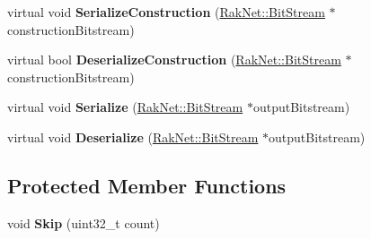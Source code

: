 \begin{DoxyCompactItemize}
\item 
\hypertarget{class_rak_net_1_1_rak_net_random_sync_a5b788f04394111d9384e5e667b8f8dec}{virtual void {\bfseries Serialize\-Construction} (\hyperlink{class_rak_net_1_1_bit_stream}{Rak\-Net\-::\-Bit\-Stream} $\ast$construction\-Bitstream)}\label{class_rak_net_1_1_rak_net_random_sync_a5b788f04394111d9384e5e667b8f8dec}

\item 
\hypertarget{class_rak_net_1_1_rak_net_random_sync_aa6e6738ea17f87cf605025b3141b3f04}{virtual bool {\bfseries Deserialize\-Construction} (\hyperlink{class_rak_net_1_1_bit_stream}{Rak\-Net\-::\-Bit\-Stream} $\ast$construction\-Bitstream)}\label{class_rak_net_1_1_rak_net_random_sync_aa6e6738ea17f87cf605025b3141b3f04}

\item 
\hypertarget{class_rak_net_1_1_rak_net_random_sync_a101abee8b1e2b53670e2c40484c7cb44}{virtual void {\bfseries Serialize} (\hyperlink{class_rak_net_1_1_bit_stream}{Rak\-Net\-::\-Bit\-Stream} $\ast$output\-Bitstream)}\label{class_rak_net_1_1_rak_net_random_sync_a101abee8b1e2b53670e2c40484c7cb44}

\item 
\hypertarget{class_rak_net_1_1_rak_net_random_sync_a9fb0b0cb7add7f55bdf92179fca46513}{virtual void {\bfseries Deserialize} (\hyperlink{class_rak_net_1_1_bit_stream}{Rak\-Net\-::\-Bit\-Stream} $\ast$output\-Bitstream)}\label{class_rak_net_1_1_rak_net_random_sync_a9fb0b0cb7add7f55bdf92179fca46513}

\end{DoxyCompactItemize}
\subsection*{Protected Member Functions}
\begin{DoxyCompactItemize}
\item 
\hypertarget{class_rak_net_1_1_rak_net_random_sync_a61ada6b49753ae59f82f86122752592c}{void {\bfseries Skip} (uint32\-\_\-t count)}\label{class_rak_net_1_1_rak_net_random_sync_a61ada6b49753ae59f82f86122752592c}

\end{DoxyCompactItemize}
